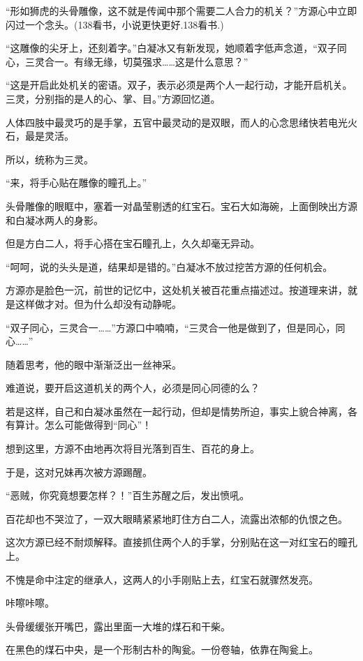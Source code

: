 
\begin{this_body}

“形如狮虎的头骨雕像，这不就是传闻中那个需要二人合力的机关？”方源心中立即闪过一个念头。(138看书，小说更快更好.138看书.)

“这雕像的尖牙上，还刻着字。”白凝冰又有新发现，她顺着字低声念道，“双子同心，三灵合一。有缘无缘，切莫强求……这是什么意思？”

“这是开启此处机关的密语。双子，表示必须是两个人一起行动，才能开启机关。三灵，分别指的是人的心、掌、目。”方源回忆道。

人体四肢中最灵巧的是手掌，五官中最灵动的是双眼，而人的心念思绪快若电光火石，最是灵活。

所以，统称为三灵。

“来，将手心贴在雕像的瞳孔上。”

头骨雕像的眼眶中，塞着一对晶莹剔透的红宝石。宝石大如海碗，上面倒映出方源和白凝冰两人的身影。

但是方白二人，将手心搭在宝石瞳孔上，久久却毫无异动。

“呵呵，说的头头是道，结果却是错的。”白凝冰不放过挖苦方源的任何机会。

方源亦是脸色一沉，前世的记忆中，这处机关被百花重点描述过。按道理来讲，就是这样做才对。但为什么却没有动静呢。

“双子同心，三灵合一……”方源口中喃喃，“三灵合一他是做到了，但是同心，同心……”

随着思考，他的眼中渐渐泛出一丝神采。

难道说，要开启这道机关的两个人，必须是同心同德的么？

若是这样，自己和白凝冰虽然在一起行动，但却是情势所迫，事实上貌合神离，各有算计。怎么可能做得到“同心”！

想到这里，方源不由地再次将目光落到百生、百花的身上。

于是，这对兄妹再次被方源踢醒。

“恶贼，你究竟想要怎样？！”百生苏醒之后，发出愤吼。

百花却也不哭泣了，一双大眼睛紧紧地盯住方白二人，流露出浓郁的仇恨之色。

这次方源已经不耐烦解释。直接抓住两个人的手掌，分别贴在这一对红宝石的瞳孔上。

不愧是命中注定的继承人，这两人的小手刚贴上去，红宝石就骤然发亮。

咔嚓咔嚓。

头骨缓缓张开嘴巴，露出里面一大堆的煤石和干柴。

在黑色的煤石中央，是一个形制古朴的陶瓮。一份卷轴，依靠在陶瓮上。


\end{this_body}
